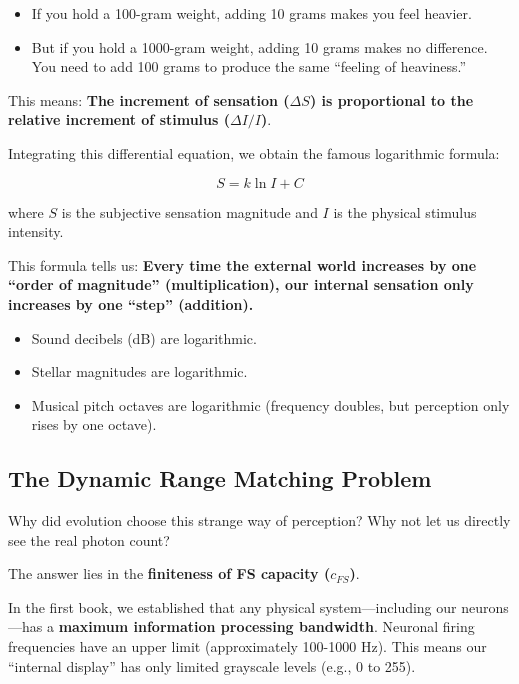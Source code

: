 \documentclass[11pt,a4paper,twoside]{book}
\begin{document}
\begin{itemize}
\item If you hold a 100-gram weight, adding 10 grams makes you feel heavier.

\item But if you hold a 1000-gram weight, adding 10 grams makes no difference. You need to add 100 grams to produce the same ``feeling of heaviness.''
\end{itemize}

This means: \textbf{The increment of sensation ($\Delta S$) is proportional to the relative increment of stimulus ($\Delta I / I$)}.

Integrating this differential equation, we obtain the famous logarithmic formula:

$$S = k \ln I + C$$

where $S$ is the subjective sensation magnitude and $I$ is the physical stimulus intensity.

This formula tells us: \textbf{Every time the external world increases by one ``order of magnitude'' (multiplication), our internal sensation only increases by one ``step'' (addition).}

\begin{itemize}
\item Sound decibels (dB) are logarithmic.

\item Stellar magnitudes are logarithmic.

\item Musical pitch octaves are logarithmic (frequency doubles, but perception only rises by one octave).
\end{itemize}

\subsection{The Dynamic Range Matching Problem}

Why did evolution choose this strange way of perception? Why not let us directly see the real photon count?

The answer lies in the \textbf{finiteness of FS capacity ($c_{FS}$)}.

In the first book, we established that any physical system---including our neurons---has a \textbf{maximum information processing bandwidth}. Neuronal firing frequencies have an upper limit (approximately 100-1000 Hz). This means our ``internal display'' has only limited grayscale levels (e.g., 0 to 255).
\end{document}
